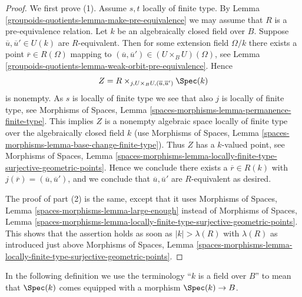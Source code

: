 \begin{proof}
We first prove (1). Assume $s, t$ locally of finite type. By
Lemma \ref{groupoids-quotients-lemma-make-pre-equivalence}
we may assume that $R$ is a pre-equivalence relation.
Let $k$ be an algebraically closed field over $B$.
Suppose $\overline{u}, \overline{u}' \in U(k)$ are $R$-equivalent.
Then for some extension field $\Omega/k$ there exists
a point $\overline{r} \in R(\Omega)$ mapping to
$(\overline{u}, \overline{u}') \in (U \times_B U)(\Omega)$, see
Lemma \ref{groupoids-quotients-lemma-weak-orbit-pre-equivalence}.
Hence
$$
Z = R \times_{j, U \times_B U, (\overline{u}, \overline{u}')} \Spec(k)
$$
is nonempty. As $s$ is locally of finite type we see that
also $j$ is locally of finite type, see
Morphisms of Spaces, Lemma \ref{spaces-morphisms-lemma-permanence-finite-type}.
This implies $Z$ is a nonempty algebraic space locally of finite type
over the algebraically closed field $k$ (use
Morphisms of Spaces,
Lemma \ref{spaces-morphisms-lemma-base-change-finite-type}).
Thus $Z$ has a $k$-valued point, see
Morphisms of Spaces, Lemma
\ref{spaces-morphisms-lemma-locally-finite-type-surjective-geometric-points}.
Hence we conclude there exists a $\overline{r} \in R(k)$ with
$j(\overline{r}) = (\overline{u}, \overline{u}')$, and we conclude that
$\overline{u}, \overline{u}'$ are $R$-equivalent as desired.

\medskip\noindent
The proof of part (2) is the same, except that it uses
Morphisms of Spaces, Lemma
\ref{spaces-morphisms-lemma-large-enough}
instead of
Morphisms of Spaces, Lemma
\ref{spaces-morphisms-lemma-locally-finite-type-surjective-geometric-points}.
This shows that the assertion holds as soon as $|k| > \lambda(R)$ with
$\lambda(R)$ as introduced just above
Morphisms of Spaces, Lemma
\ref{spaces-morphisms-lemma-locally-finite-type-surjective-geometric-points}.
\end{proof}

In the following definition we use the terminology ``$k$ is a field
over $B$'' to mean that $\Spec(k)$ comes equipped with a morphism
$\Spec(k) \to B$.

